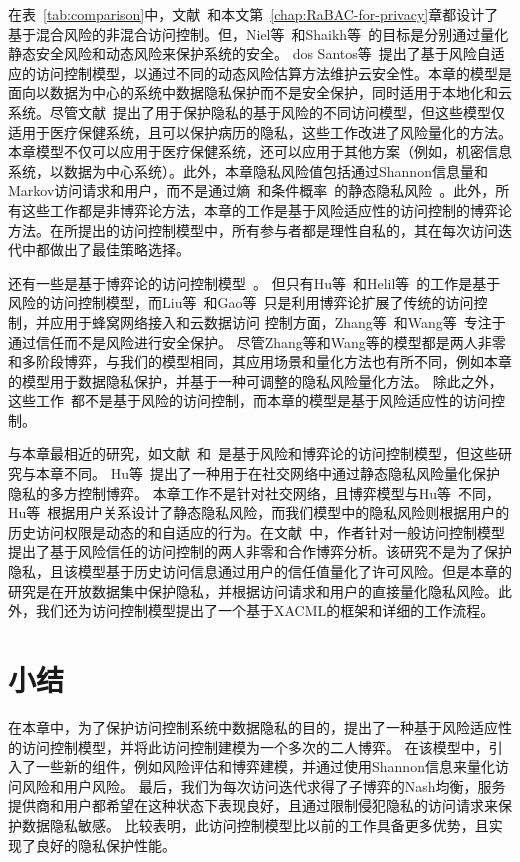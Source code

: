 在表~\ref{tab:comparison}中，文献~\cite{ni2010risk,shaikh2012dynamic,santos2016framework,wang2011quantified,zhang2018privacy,zhen2015risk}和本文第~\ref{chap:RaBAC-for-privacy}章都设计了基于混合风险的非混合访问控制。但，Niel等~\cite{ni2010risk}和Shaikh等~\cite{shaikh2012dynamic}的目标是分别通过量化静态安全风险和动态风险来保护系统的安全。 dos Santos等~\cite{santos2016framework}提出了基于风险自适应的访问控制模型，以通过不同的动态风险估算方法维护云安全性。本章的模型是面向以数据为中心的系统中数据隐私保护而不是安全保护，同时适用于本地化和云系统。尽管文献~\cite{wang2011quantified,zhen2015risk,zhang2018privacy}提出了用于保护隐私的基于风险的不同访问模型，但这些模型仅适用于医疗保健系统，且可以保护病历的隐私，这些工作改进了风险量化的方法。本章模型不仅可以应用于医疗保健系统，还可以应用于其他方案（例如，机密信息系统，以数据为中心系统）。此外，本章隐私风险值包括通过Shannon信息量和Markov访问请求和用户，而不是通过熵~\cite{zhen2015risk}和条件概率~\cite{zhang2018privacy}的静态隐私风险~\cite{wang2011quantified}。此外，所有这些工作都是非博弈论方法，本章的工作是基于风险适应性的访问控制的博弈论方法。在所提出的访问控制模型中，所有参与者都是理性自私的，其在每次访问迭代中都做出了最佳策略选择。


还有一些是基于博弈论的访问控制模型~\cite{liu2016dynamic,gao2018game,zhang2015towards,wang2019game,hu2014game,helil2017non}。 但只有Hu等~\cite{hu2014game}和Helil等~\cite{helil2017non}的工作是基于风险的访问控制模型，而Liu等~\cite{liu2016dynamic}和Gao等~\cite{gao2018game}只是利用博弈论扩展了传统的访问控制，并应用于蜂窝网络接入和云数据访问 控制方面，Zhang等~\cite{zhang2015towards}和Wang等~\cite{wang2019game}专注于通过信任而不是风险进行安全保护。 尽管Zhang等和Wang等的模型都是两人非零和多阶段博弈，与我们的模型相同，其应用场景和量化方法也有所不同，例如本章的模型用于数据隐私保护，并基于一种可调整的隐私风险量化方法。 除此之外，这些工作~\cite{liu2016dynamic,gao2018game,zhang2015towards,wang2019game}都不是基于风险的访问控制，而本章的模型是基于风险适应性的访问控制。

与本章最相近的研究，如文献~\cite{hu2014game}和~\cite{helil2017non}是基于风险和博弈论的访问控制模型，但这些研究与本章不同。 Hu等~\cite{hu2014game}提出了一种用于在社交网络中通过静态隐私风险量化保护隐私的多方控制博弈。
本章工作不是针对社交网络，且博弈模型与Hu等~\cite{hu2014game}不同，Hu等~\cite{hu2014game}根据用户关系设计了静态隐私风险，而我们模型中的隐私风险则根据用户的历史访问权限是动态的和自适应的行为。在文献~\cite{helil2017non}中，作者针对一般访问控制模型提出了基于风险信任的访问控制的两人非零和合作博弈分析。该研究不是为了保护隐私，且该模型基于历史访问信息通过用户的信任值量化了许可风险。但是本章的研究是在开放数据集中保护隐私，并根据访问请求和用户的直接量化隐私风险。此外，我们还为访问控制模型提出了一个基于XACML的框架和详细的工作流程。

\section{小结}\label{sec:conclusions}

在本章中，为了保护访问控制系统中数据隐私的目的，提出了一种基于风险适应性的访问控制模型，并将此访问控制建模为一个多次的二人博弈。 在该模型中，引入了一些新的组件，例如风险评估和博弈建模，并通过使用Shannon信息来量化访问风险和用户风险。 最后，我们为每次访问迭代求得了子博弈的Nash均衡，服务提供商和用户都希望在这种状态下表现良好，且通过限制侵犯隐私的访问请求来保护数据隐私敏感。 比较表明，此访问控制模型比以前的工作具备更多优势，且实现了良好的隐私保护性能。